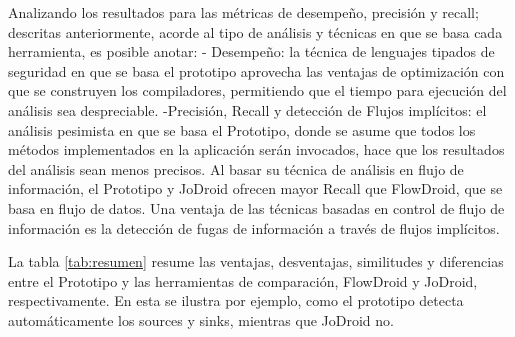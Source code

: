 Analizando los resultados para las métricas de desempeño, precisión y recall;
descritas anteriormente, acorde al tipo de análisis y técnicas en que se basa
cada herramienta, es posible anotar:\newline 
- Desempeño: la técnica de lenguajes tipados de seguridad en que se basa el
prototipo aprovecha las ventajas de optimización con que se construyen los
compiladores, permitiendo que el tiempo para ejecución del análisis sea
despreciable.\newline 
-Precisión, Recall y detección de Flujos implícitos: el análisis pesimista en
que se basa el Prototipo, donde se asume que todos los métodos implementados en
la aplicación serán invocados, hace que los resultados del análisis sean menos
precisos.
Al basar su técnica de análisis en flujo de información, el Prototipo y JoDroid
ofrecen mayor Recall que FlowDroid, que se basa en flujo de datos.\newline
Una ventaja de las técnicas basadas en control de flujo de información es la
detección de fugas de información a través de flujos implícitos.\newline

La tabla \ref{tab:resumen} resume 
las ventajas, desventajas, similitudes y
diferencias entre el Prototipo y las herramientas de comparación, FlowDroid y
JoDroid, respectivamente. En esta se ilustra por ejemplo, como el prototipo
detecta automáticamente los sources y sinks, mientras que JoDroid no.

